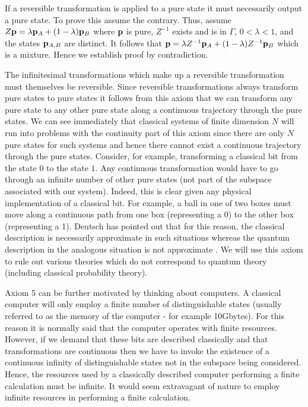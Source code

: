\documentclass[12pt]{article}
\begin{document}
If a reversible transformation
is applied to a pure state it must necessarily output a pure state.  To
prove this assume the contrary.  Thus, assume $Z{\bf p}=\lambda{\bf
p}_A+(1-\lambda){\bf p}_B$ where ${\bf p}$ is pure, $Z^{-1}$ exists and
is in $\Gamma$, $0<\lambda<1$, and the states ${\bf p}_{A,B}$ are distinct.
It follows that ${\bf p}=\lambda Z^{-1}{\bf p}_A+(1-\lambda)Z^{-1}{\bf p}_B$
which is a mixture. Hence we establish proof by contradiction.

The infinitesimal transformations which make up a reversible
transformation must themselves be reversible. 
Since reversible transformations always transform pure states to pure
states it follows from this axiom that we can transform any pure state
to any other pure state along a continuous trajectory through the pure states.
We can see immediately that classical systems of finite
dimension $N$ will run into problems with the continuity part of this
axiom since there are only $N$ pure states for such systems and hence
there cannot exist a continuous trajectory through the pure states.
Consider, for example, transforming a
classical bit from the state $0$ to the state $1$.  Any continuous
transformation would have to go through an infinite number of other pure
states (not part of the subspace associated with our system).
Indeed, this is clear given any
physical implementation of a classical bit.  For example, a ball in one
of two boxes must move along a continuous path from one box (representing
a 0) to the other box (representing a 1).  Deutsch has pointed out that
for this reason, the classical description is necessarily approximate in
such situations whereas the quantum description in the analogous
situation is not approximate \cite{deutsch}.  We will use this axiom to
rule out various theories which do not correspond to quantum theory
(including classical probability theory).

Axiom 5 can be further motivated by thinking about computers.  A
classical computer will only employ a finite number of distinguishable
states (usually referred to as the memory of the computer - for example
10Gbytes).  For this reason it is normally said that the computer operates
with finite resources. However, if we
demand that these bits are described classically and that
transformations are continuous then we have to invoke the existence of
a continuous infinity of distinguishable states not in the subspace
being considered.  Hence, the resources used by a classically described
computer performing a finite calculation must be infinite.  It would seem
extravagant of nature to employ infinite resources in performing a
finite calculation.
\end{document}
